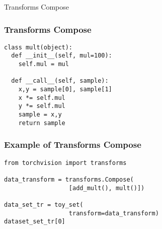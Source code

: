 \documentclass[14 pt]{beamer}
\begin{document}
\begin{frame}
\begin{center}
\Large{Transforms Compose}
\end{center}
\end{frame}

\begin{frame}[fragile]
  \frametitle{Transforms Compose}
  \begin{block}{}
\begin{verbatim}
class mult(object):
  def __init__(self, mul=100):
    self.mul = mul

  def __call__(self, sample):
    x,y = sample[0], sample[1]
    x *= self.mul
    y *= self.mul
    sample = x,y
    return sample
\end{verbatim}
  \end{block}
\end{frame}

\begin{frame}[fragile]
  \frametitle{Example of Transforms Compose}
  \begin{block}{}
\begin{verbatim}
from torchvision import transforms

data_transform = transforms.Compose(
                  [add_mult(), mult()])

data_set_tr = toy_set(
                  transform=data_transform)
dataset_set_tr[0]
\end{verbatim}
  \end{block}
\end{frame}
\end{document}
